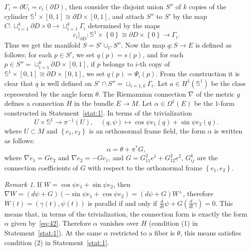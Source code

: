 \documentclass[12pt,letterpaper]{amsart}
\theoremstyle{definition}
\theoremstyle{plain}
\theoremstyle{remark}
\newtheorem{rem}{Remark}
\begin{document}
$\Gamma_i = \partial U_i = c_i (\partial D)$, then
consider the disjoint union $S''$ of $k$ copies of the cylinder $\mathbb{S}^1 \times [0, 1] \cong \partial D \times [0, 1]$, and attach $S''$ to $S'$ by the map
$C : \sqcup_{i = 1}^k \partial D \times {0} \to \sqcup_{i = 1}^k \Gamma_i$ determined by the maps
\begin{equation}
\left. c_i \right|_{\partial D} : \mathbb{S}^1 \times \left\{ 0 \right\} \cong \partial D \times \left\{ 0 \right\} \to \Gamma_i.
\label{eq:40}
\end{equation}
Thus we get the manifold $S = S' \cup_C S''$.
Now the map $q : S \to E$ is defined as follows: for each $p \in S'$, we set $q(p) = s(p)$, and for each $p \in S'' = \sqcup_{i = 1}^k \partial D \times [0, 1]$, if $p$ belongs to $i$-th copy of $\mathbb{S}^1 \times [0, 1] \cong \partial D \times [0, 1]$, we set $q(p) = \Psi_i(p)$.
From the construction it is clear that $q$ is well defined on $S' \cap S'' = \sqcup_{i=1, k} \Gamma_i$.
Let $a \in H^1(\mathbb{S}^1)$ be the class represented by the angle form $\theta$.
The Riemannian connection $\nabla$ of the metric $g$ defines a connection $H$ in the bundle $E \to M$.
Let $\alpha \in \Omega^1(E)$ be the $1$-form constructed in Statement~\ref{stat:1}.
In terms of the trivialization
\begin{equation}
U \times \mathbb{S}^1 \to \pi^{-1}(U), \quad (q, \psi) \mapsto \cos\psi e_1(q) + \sin\psi e_2(q).
\label{eq:41}
\end{equation}
where $U \subset M$ and $\left\{ e_1, e_2 \right\}$ is an orthonormal frame field, the form $\alpha$ is written as follows:
\begin{equation}
\alpha = \theta + \pi^* G,
\label{eq:42}
\end{equation}
where $\nabla e_1 = G e_2$ and $\nabla e_2 = -G e_1$, and $G = G^2_{11} e^1 + G^2_{12} e^2$, $G^k_{ij}$ are the connection coefficients of $G$ with respect to the orthonormal frame $\left\{ e_1, e_2 \right\}$.
\begin{rem}
If $W = \cos\psi e_1 + \sin\psi e_2$, then $\nabla W = (d\psi + G)(-\sin\psi e_1 + \cos\psi e_2) = (d\psi + G) W^\perp$, therefore $W(t) = (\gamma(t), \psi(t))$ is parallel if and only if $\frac{d}{dt}\psi + G(\frac{d}{dt}\gamma) = 0$.
This means that, in terms of the trivialization, the connection form is exactly the form $\alpha$ given by~\eqref{eq:42}.
Therefore $\alpha$ vanishes over $H$ (condition (1) in Statement~\ref{stat:1}).
At the same $\alpha$ restricted to a fiber is $\theta$, this means satisfies condition (2) in Statement~\ref{stat:1}.
\label{rem:7}
\end{rem}
\end{document}
